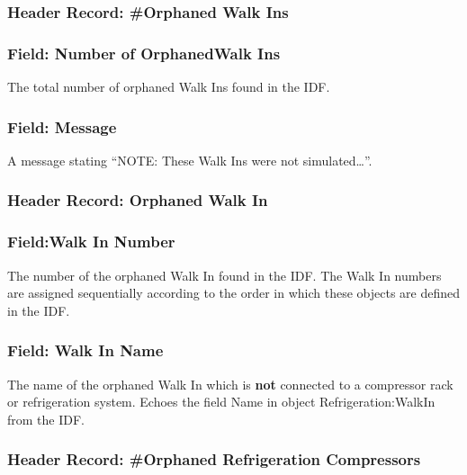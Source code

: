\subsubsection{Header Record: \#Orphaned Walk Ins}\label{header-record-orphaned-walk-ins}

\subsubsection{Field: Number of OrphanedWalk Ins}\label{field-number-of-orphanedwalk-ins}

The total number of orphaned Walk Ins found in the IDF.

\subsubsection{Field: Message}\label{field-message-1}

A message stating ``NOTE: These Walk Ins were not simulated\ldots{}''.

\subsubsection{Header Record: Orphaned Walk In}\label{header-record-orphaned-walk-in}

\subsubsection{Field:Walk In Number}\label{fieldwalk-in-number}

The number of the orphaned Walk In found in the IDF. The Walk In numbers are assigned sequentially according to the order in which these objects are defined in the IDF.

\subsubsection{Field: Walk In Name}\label{field-walk-in-name-1}

The name of the orphaned Walk In which is \textbf{not} connected to a compressor rack or refrigeration system. Echoes the field Name in object Refrigeration:WalkIn from the IDF.

\subsubsection{Header Record: \#Orphaned Refrigeration Compressors}\label{header-record-orphaned-refrigeration-compressors}

